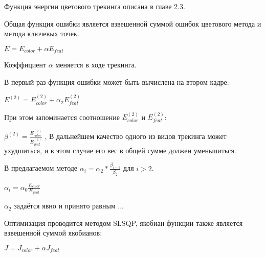Функция энергии цветового трекинга описана в главе 2.3.

Общая функция ошибки является взвешенной суммой ошибок цветового метода и метода ключевых точек. 

$E = E_{color} + \alpha E_{feat}$

Коэффициент $\alpha$ меняется в ходе трекинга.

В первый раз функция ошибки может быть вычислена на втором кадре:

$E^{(2)} = E_{color}^{(2)} + \alpha_2 E_{feat}^{(2)}$

При этом запоминается соотношение $E_{color}^{(2)}$ и $E_{feat}^{(2)}$:

$\beta^{(2)} = \frac{E_{color}^{(2)}}{E_{feat}^{(2)}}$
,
В дальнейшем качество одного из видов трекинга может ухудшиться, и в этом случае его вес в общей сумме должен уменьшиться.

В предлагаемом методе $\alpha_i = \alpha_2 * \frac{\beta_{i - 1}}{\beta_2}$ для $i > 2$.

$\alpha_i = \alpha_0 \frac{E_{color}}{E_{feat}}$

$\alpha_2$ задаётся явно и принято равным ...

Оптимизация проводится методом SLSQP, якобиан функции также является взвешенной суммой якобианов:

$J = J_{color} + \alpha J_{feat}$